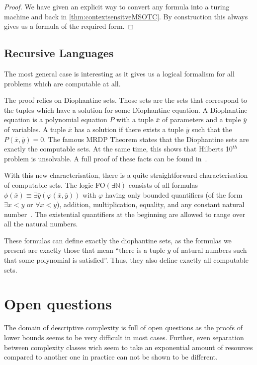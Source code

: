 \begin{proof}
    We have given an explicit way to convert any formula into a turing machine and back in \cref{thm:contextsensitveMSOTC}.
    By construction this always gives us a formula of the required form.
\end{proof}


\subsection{Recursive Languages}\label{subsec:des-recursive-languages}

The most general case is interesting as it gives us a logical formalism for all problems which are computable at all.

The proof relies on Diophantine sets.
Those sets are the sets that correspond to the tuples which have a solution for some Diophantine equation.
A Diophantine equation is a polynomial equation $P$ with a tuple $\overline{x}$ of parameters and a tuple $\overline{y}$ of variables.
A tuple $\overline{x}$ has a solution if there exists a tuple $\overline{y}$ such that the $P(\overline{x}, \overline{y}) = 0$.
The famous MRDP Theorem states that the Diophantine sets are exactly the computable sets.
At the same time, this shows that Hilberts 10$^{th}$ problem is unsolvable.
A full proof of these facts can be found in~\cite{Matijasevic1996}.

With this new characterisation, there is a quite straightforward characterisation of computable sets.
The logic FO$(\exists \mathbb{N})$ consists of all formulas $\phi(\overline{x}) \equiv \exists \overline{y} (\varphi(\overline{x}, \overline{y}))$ with $\varphi$ having only bounded quantifiers (of the form $\exists x < y$ or $\forall x < y$), addition, multiplication, equality, and any constant natural number~\cite{Entropy2020}.
The existential quantifiers at the beginning are allowed to range over all the natural numbers.

These formulas can define exactly the diophantine sets, as the formulas we present are exactly those that mean ``there is a tuple $\overline{y}$ of natural numbers such that some polynomial is satisfied''.
Thus, they also define exactly all computable sets.

\section{Open questions}\label{sec:open-questions}

The domain of descriptive complexity is full of open questions as the proofs of lower bounds seems to be very difficult in most cases.
Further, even separation between complexity classes wich seem to take an exponential amount of resources compared to another one in practice can not be shown to be different.

